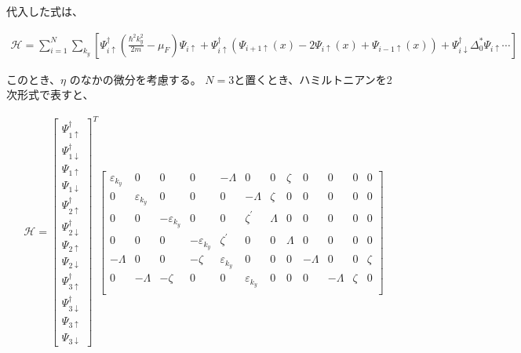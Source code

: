 \documentclass{jsarticle}
\begin{document}
            代入した式は、

		    \begin{align}
			    \mathcal{H}= \sum_{i=1}^N \sum_{k_y}
			    \left[ \Psi^\dagger_{i\uparrow} \left( \frac{\hbar^2k_y^2}{2m}-\mu_F \right)\Psi_{i\uparrow}
			    +\Psi^\dagger_{i\uparrow} \left( \Psi_{i+1\uparrow}\left(x\right)-2\Psi_{i\uparrow}\left(x\right)+\Psi_{i-1\uparrow}\left(x\right)
			    \right)+\Psi^\dagger_{i\downarrow} \Delta_0^\ast \Psi_{i\uparrow} \cdots
			    \right]
		    \end{align}

		    このとき、$\eta$ のなかの微分を考慮する。
		    $N=3$と置くとき、ハミルトニアンを2次形式で表すと、

		    \begin{align}
			    \mathcal{H}=
			    \begin{bmatrix}
				    \Psi_{1\uparrow}^\dagger \\
				    \Psi_{1\downarrow}^\dagger \\
				    \Psi_{1\uparrow} \\
			    	\Psi_{1\downarrow} \\
				    \Psi_{2\uparrow}^\dagger \\
				    \Psi_{2\downarrow}^\dagger \\
			    	\Psi_{2\uparrow} \\
			    	\Psi_{2\downarrow} \\
			    	\Psi_{3\uparrow}^\dagger \\
			    	\Psi_{3\downarrow}^\dagger \\
			    	\Psi_{3\uparrow} \\
			    	\Psi_{3\downarrow}
			    \end{bmatrix}
			    ^T
			    \begin{bmatrix}
			    	\varepsilon_{k_y} & 0 & 0 & 0 & -\varLambda & 0 & 0 & \zeta & 0 & 0 & 0 & 0 \\
			    	0 & \varepsilon_{k_y} & 0 & 0 & 0 & -\varLambda & \zeta & 0 & 0 & 0 & 0 & 0 \\
			    	0 & 0 & -\varepsilon_{k_y} & 0 & 0 & \zeta^{'} & \varLambda & 0 & 0 & 0 & 0 & 0 \\
			    	0 & 0 & 0 & -\varepsilon_{k_y} & \zeta^{'} & 0 & 0 & \varLambda & 0 & 0 & 0 & 0 \\
			    	-\varLambda & 0 & 0 & -\zeta & \varepsilon_{k_y} & 0 & 0 & 0 & -\varLambda & 0 & 0 & \zeta \\
			    	0 & -\varLambda & -\zeta & 0 & 0 & \varepsilon_{k_y} & 0 & 0 & 0 & -\varLambda & \zeta & 0 \\

\end{bmatrix}
\end{align}
\end{document}
